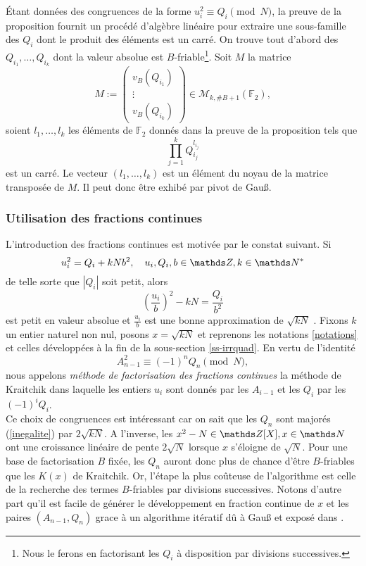 Étant données des congruences de la forme $u_i^2 \equiv Q_i \pmod{N}$, la
preuve de la proposition fournit un procédé d'algèbre linéaire pour extraire
une sous-famille des $Q_i$ dont le produit des éléments est un carré. On trouve
tout d'abord des $Q_{i_1}, \dots, Q_{i_k}$ dont la valeur absolue est
$B$-friable\footnote{Nous le ferons en factorisant les $Q_i$ à disposition par
divisions successives.}. Soit $M$ la matrice \[M := \begin{pmatrix}
v_B(Q_{i_1}) \\ \vdots \\ v_B(Q_{i_k})\end{pmatrix}\in \mathcal{M}_{k,
\#B+1}(\mathbb{F}_2),\] soient $l_{1}, \dots, l_{k}$ les éléments de
$\mathbb{F}_2$ donnés dans la preuve de la proposition tels que \[\prod_{j=1}^k
Q_{i_j}^{l_{i_j}}\] est un carré. Le vecteur $(l_1, \dots, l_{k})$ est un
élément du noyau de la matrice transposée de $M$. Il peut donc être exhibé 
par pivot de Gau\ss{}.

\subsubsection{Utilisation des fractions continues}

L'introduction des fractions continues est motivée par le constat suivant. Si
\[u_i^2 = Q_i + kNb^2, \quad u_i, Q_i, b\in \Z, k\in \N^*\] de telle sorte que
$| Q_i |$ soit petit, alors \[\left(\frac{u_i}{b}\right)^2 - kN =
\frac{Q_i}{b^2}\] est petit en valeur absolue et $\frac{u_i}{b}$ est une bonne
approximation de $\sqrt{kN}$ . Fixons $k$ un entier naturel non nul,
posons $x = \sqrt{kN}$ et reprenons les notations \ref{notations} et celles
développées à la fin de la sous-section \ref{ss-irrquad}. En vertu de
l'identité \[A_{n-1}^2 \equiv (-1)^n Q_n \pmod{N},\] nous appelons
\emph{méthode de factorisation des fractions continues} la méthode de Kraitchik
dans laquelle les entiers $u_i$ sont donnés par les $A_{i-1}$ et les $Q_i$ par
les $(-1)^i Q_i$. \\

Ce choix de congruences est intéressant car on sait que les $Q_n$ sont majorés
(\ref{inegalite}) par $2\sqrt{kN}$. A l'inverse, les $x^2 - N\in \Z[X], x\in \N$
ont une croissance linéaire de pente $2\sqrt{N}$ lorsque $x$ s'éloigne de 
$\sqrt{N}$. Pour une base de factorisation $B$ fixée, les $Q_n$ auront donc
plus de chance d'être $B$-friables que les $K(x)$ de Kraitchik. Or, l'étape la 
plus coûteuse de l'algorithme est celle de la recherche des termes $B$-friables
par divisions successives. Notons d'autre part qu'il est facile de générer le
développement en fraction continue de $x$ et les paires $(A_{n-1}, Q_n)$ grace
à un algorithme itératif dû à Gau\ss{} et exposé dans . \\

